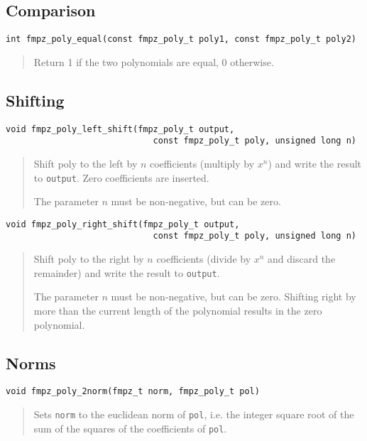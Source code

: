 \documentclass[a4paper,10pt]{article}
\newcommand{\code}{\lstinline}
\begin{document}
\subsection{Comparison}


\begin{lstlisting}
int fmpz_poly_equal(const fmpz_poly_t poly1, const fmpz_poly_t poly2) 
\end{lstlisting}
\begin{quote}
Return 1 if the two polynomials are equal, 0 otherwise.
\end{quote}


\subsection{Shifting}

\begin{lstlisting}
void fmpz_poly_left_shift(fmpz_poly_t output, 
                             const fmpz_poly_t poly, unsigned long n) 
\end{lstlisting}
\begin{quote}
Shift poly to the left by $n$ coefficients (multiply by $x^n$) and write the result to \code{output}. Zero coefficients are inserted.

The parameter $n$ must be non-negative, but can be zero.
\end{quote}

\begin{lstlisting}
void fmpz_poly_right_shift(fmpz_poly_t output, 
                             const fmpz_poly_t poly, unsigned long n) 
\end{lstlisting}
\begin{quote}
Shift poly to the right by $n$ coefficients (divide by $x^n$ and discard the remainder) and write the result to \code{output}. 

The parameter $n$ must be non-negative, but can be zero. Shifting right by more than the current length of the polynomial results in the zero polynomial.
\end{quote}


\subsection{Norms}

\begin{lstlisting}
void fmpz_poly_2norm(fmpz_t norm, fmpz_poly_t pol)\end{lstlisting}
\begin{quote}
Sets \code{norm} to the euclidean norm of \code{pol}, i.e. the integer square root of the sum of the squares of the coefficients of \code{pol}.
\end{quote}
\end{document}
